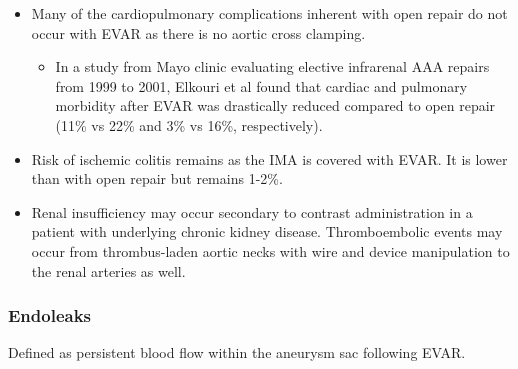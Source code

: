 \documentclass[
]{book}
\providecommand{\tightlist}{%
  \setlength{\itemsep}{0pt}\setlength{\parskip}{0pt}}
\begin{document}
\begin{itemize}
\item
  Many of the cardiopulmonary complications inherent with open repair
  do not occur with EVAR as there is no aortic cross clamping.

  \begin{itemize}
  \tightlist
  \item
    In a study from Mayo clinic evaluating elective infrarenal AAA
    repairs from 1999 to 2001, Elkouri et al found that cardiac and
    pulmonary morbidity after EVAR was drastically reduced compared
    to open repair (11\% vs 22\% and 3\% vs 16\%, respectively).
    \citep{elkouriPerioperativeComplicationsEarly2004}
  \end{itemize}
\item
  Risk of ischemic colitis remains as the IMA is covered with EVAR. It
  is lower than with open repair but remains 1-2\%.
\item
  Renal insufficiency may occur secondary to contrast administration
  in a patient with underlying chronic kidney disease. Thromboembolic
  events may occur from thrombus-laden aortic necks with wire and
  device manipulation to the renal arteries as well.
\end{itemize}

\hypertarget{endoleaks}{%
\subsubsection{Endoleaks}\label{endoleaks}}

Defined as persistent blood flow within the aneurysm sac following EVAR.
\end{document}
